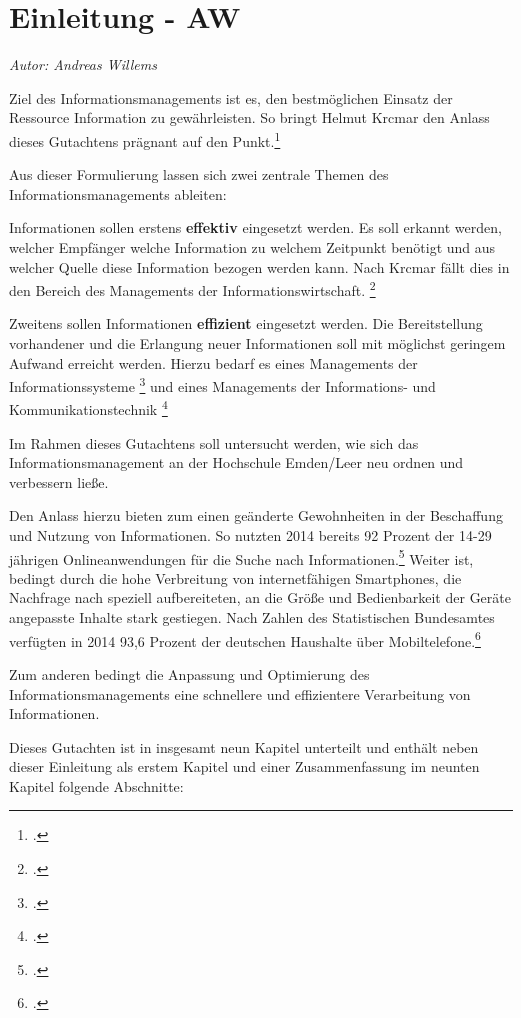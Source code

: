 \chapter{Einleitung - AW}
\textit{Autor: Andreas Willems}

\glqq Ziel des Informationsmanagements ist es, den bestmöglichen Einsatz der 
Ressource Information zu gewährleisten.\grqq{} So bringt Helmut Krcmar den 
Anlass dieses Gutachtens prägnant auf den Punkt.\footcite[11]{krcmar_einfuhrung_2015}

Aus dieser Formulierung lassen sich zwei zentrale Themen des Informationsmanagements ableiten:

Informationen sollen erstens \textbf{effektiv} eingesetzt werden. Es soll erkannt werden, 
welcher Empfänger welche Information zu welchem Zeitpunkt benötigt und aus welcher 
Quelle diese Information bezogen werden kann. Nach Krcmar fällt dies in den Bereich des
\glqq Managements der Informationswirtschaft\grqq{}.
\footcite[Vgl.][13 ff.]{krcmar_einfuhrung_2015}

Zweitens sollen Informationen \textbf{effizient} eingesetzt werden. Die Bereitstellung vorhandener und die Erlangung neuer Informationen soll mit möglichst geringem Aufwand
erreicht werden. Hierzu bedarf es eines \glqq Managements der Informationssysteme\grqq{}
\footcite[Vgl.][41 ff.]{krcmar_einfuhrung_2015}
und eines \glqq Managements der Informations- und Kommunikationstechnik\grqq{}
\footcite[Vgl.][89 ff.]{krcmar_einfuhrung_2015}

Im Rahmen dieses Gutachtens soll untersucht werden, wie sich das Informationsmanagement
an der Hochschule Emden/Leer neu ordnen und verbessern ließe.

Den Anlass hierzu bieten zum einen geänderte Gewohnheiten in der Beschaffung und 
Nutzung von Informationen. So nutzten 2014 bereits 92 Prozent der 14-29 jährigen Onlineanwendungen
für die Suche nach Informationen.\footcite{ardzdf_studie_2014}
Weiter ist, bedingt durch die hohe Verbreitung von internetfähigen Smartphones, die Nachfrage nach speziell 
aufbereiteten, an die Größe und Bedienbarkeit der Geräte angepasste Inhalte stark gestiegen. Nach Zahlen des 
Statistischen Bundesamtes verfügten in 2014 93,6 Prozent der deutschen Haushalte über 
Mobiltelefone.\footcite{statistisches_bundesamt_2015}

Zum anderen bedingt die Anpassung und Optimierung des Informationsmanagements eine schnellere und 
effizientere Verarbeitung von Informationen.

Dieses Gutachten ist in insgesamt neun Kapitel unterteilt und enthält neben dieser Einleitung als erstem Kapitel und einer Zusammenfassung im neunten Kapitel folgende Abschnitte:

